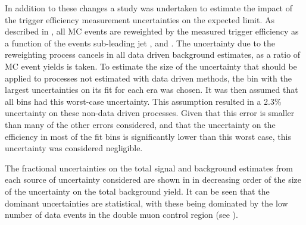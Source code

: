 In addition to these changes a study was undertaken to estimate the impact of the trigger efficiency measurement uncertainties on the expected limit. As described in , all \ac{MC} events are reweighted by the measured trigger efficiency as a function of the events sub-leading jet \pt, \METnoMU and \Mjj. The uncertainty due to the reweighting process cancels in all data driven background estimates, as a ratio of \ac{MC} event yields is taken. To estimate the size of the uncertainty that should be applied to processes not estimated with data driven methods, the bin with the largest uncertainties on its fit for each era was chosen. It was then assumed that all bins had this worst-case uncertainty. This assumption resulted in a 2.3\% uncertainty on these non-data driven processes. Given that this error is smaller than many of the other errors considered, and that the uncertainty on the efficiency in most of the fit bins is significantly lower than this worst case, this uncertainty was considered negligible.

The fractional uncertainties on the total signal and background estimates from each source of uncertainty considered are shown in  in decreasing order of the size of the uncertainty on the total background yield. It can be seen that the dominant uncertainties are statistical, with these being dominated by the low number of data events in the double muon control region (see ).

